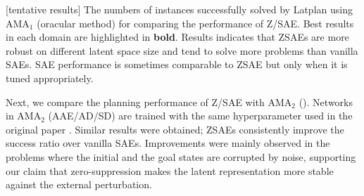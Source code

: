\begin{table}[htbp]
\caption{
[tentative results]
The numbers of instances successfully solved by Latplan using AMA$_1$ (oracular method)
for comparing the performance of Z/SAE.
Best results in each domain are highlighted in \textbf{bold}.
Results indicates that ZSAEs are more robust on different latent space size and tend to solve more problems than vanilla SAEs.
SAE performance is sometimes comparable to ZSAE but only when it is tuned appropriately.
}
\label{tab:ama1}
\end{table}

Next, we compare the planning performance of Z/SAE with AMA$_2$ ().
Networks in AMA$_2$ (AAE/AD/SD) are trained with the same hyperparameter 
used in the original paper \cite{Asai2018}.
Similar results were obtained; ZSAEs consistently improve the success ratio over vanilla SAEs.
Improvements were mainly observed in the problems where
the initial and the goal states are corrupted by noise, supporting our claim that
zero-suppression makes the latent representation more stable against the external perturbation.

% 
% 

